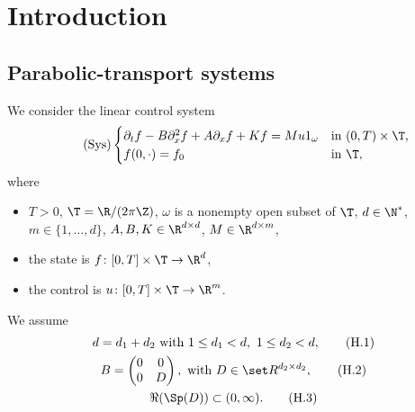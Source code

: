 \section{Introduction}
\subsection{Parabolic-transport systems}
We consider the linear control system
\begin{equation}
\label{Syst}\tag{Sys}
\begin{cases}
\partial_t f- B \partial_{x}^2 f + A \partial_x f + K f = M u 1_{\omega} &\text{in}\ (0,T)\times \T,\\
f(0,\cdot)=f_0& \text{in}\ \T,
\end{cases}
\end{equation}
where
\begin{itemize}
\item $T >0$, $\T = \R/(2\pi \Z)$, $\omega$ is a nonempty open subset of $\T$, $d \in \N^{*}$, $m\in\{1,\dots,d\}$, $A, B, K \in \R^{d \times d}$, $M\in\R^{d\times m}$,
\item the state is $f\colon [0,T]\times\T \to \R^d$,
\item the control is $u\colon [0,T]\times\T \to \R^m$.
\end{itemize}
We assume
\begin{gather}
d=d_1 + d_2\ \text{with}\ 1 \leq d_1 < d,\ 1 \leq d_2 < d,\label{dd1d2}\tag{H.1}\\
B = \begin{pmatrix}0&0\\0&D\end{pmatrix},\text{ with } D\in \set R^{d_2\times d_2},\label{h:B}\tag{H.2}\\
\Re(\Sp(D)) \subset (0,\infty). \label{h:D}\tag{H.3}
\end{gather}

